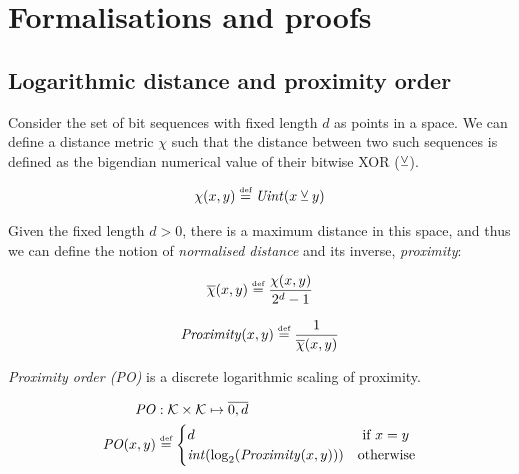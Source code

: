 
\chapter{Formalisations and proofs}\label{sec:formalisation}

\section{Logarithmic distance and proximity order \statusgreen}\label{sec:proximity}
Consider the set of bit sequences with fixed length $d$ as points in a space. We can define a distance metric $\chi$ such that
the distance between two such sequences is defined as the bigendian numerical value of their bitwise XOR ($\veebar$).

\begin{definition}\label{def:xor}
\begin{equation}
\chi(x, y) \overset{\textrm{\tiny def}}{=} \mathit{Uint}(x  \veebar y)
\end{equation}
\end{definition}

Given the fixed length $d>0$, there is a maximum distance in this space, and thus we can define the notion of \emph{normalised distance} and its inverse, \emph{proximity}:

\begin{definition}\label{def:normalisedxor}
\begin{equation}
\overline{\chi}(x, y) \overset{\textrm{\tiny def}}{=} \frac{\chi(x,y)}{2^d-1}
\end{equation}
\end{definition}

\begin{definition}[proximity]\label{def:proximity}
\begin{equation}
\mathit{Proximity}(x, y) \overset{\textrm{\tiny def}}{=} \frac{1}{\overline{\chi}(x,y)}
\end{equation}{}
\end{definition}


\emph{Proximity order (PO)} is a discrete logarithmic scaling of proximity.


\begin{definition}\label{def:xorPO}
\begin{equation}
\begin{split}
\mathit{PO}&: \mathcal{K} \times\mathcal{K}\mapsto \overline{0,d}\\
\mathit{PO}(x,y) &\overset{\textrm{\tiny def}}{=} 
\begin{cases}
d & \text{ if } x=y\\
\mathit{int}(\log_2(\mathit{Proximity}(x, y)))&\text{otherwise}\\
\end{cases}
\end{split}
\end{equation}
\end{definition}



